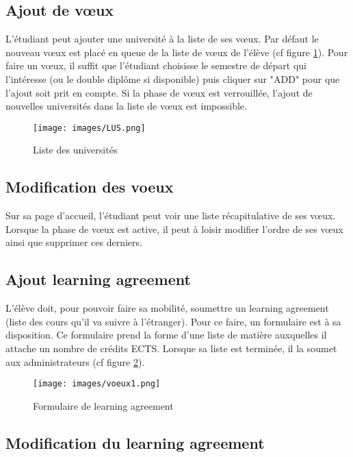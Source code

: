 \subsection{Ajout de vœux}

L'étudiant peut ajouter une université à la liste de ses vœux. Par défaut le nouveau vœux est placé en queue de la liste de vœux de l'élève (cf figure \ref{lus}). Pour faire un vœux, il suffit que l'étudiant choisisse le semestre de départ qui l'intéresse (ou le double diplôme si disponible) puis cliquer sur "ADD" pour que l'ajout soit prit en compte. 
\smallbreak
Si la phase de vœux est verrouillée, l'ajout de nouvelles universités dans la liste de vœux est impossible.

\begin{figure}[H]
	\centering
	\texttt{[image: images/LUS.png]}
	\caption{Liste des universités}
	\label{lus}
\end{figure}

\subsection{Modification des voeux}

Sur sa page d'accueil, l'étudiant peut voir une liste récapitulative de ses vœux. Lorsque la phase de vœux est active, il peut à loisir modifier l'ordre de ses vœux ainsi que supprimer ces derniers.

\subsection{Ajout learning agreement}

L'élève doit, pour pouvoir faire sa mobilité, soumettre un learning agreement (liste des cours qu'il va suivre à l'étranger). Pour ce faire, un formulaire est à sa disposition. Ce formulaire prend la forme d'une liste de matière auxquelles il attache un nombre de crédits ECTS. Lorsque sa liste est terminée, il la soumet aux administrateurs (cf figure \ref{voeux1}).

\begin{figure}[H]
	\centering
	\texttt{[image: images/voeux1.png]}
	\caption{Formulaire de learning agreement}
	\label{voeux1}
\end{figure}

\subsection{Modification du learning agreement}

